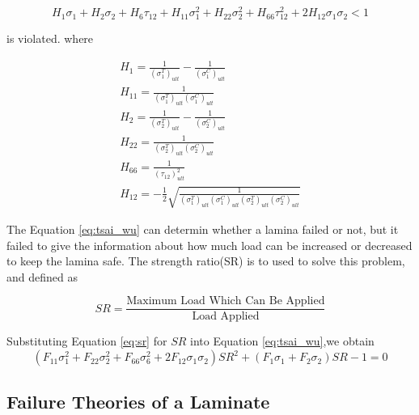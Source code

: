 \documentclass[smallextended]{svjour3}       %
\begin{document}
\begin{equation} \label{eq:tsai_wu}
H_1 \sigma_1 + H_2 \sigma_2 + H_6 \tau_{12} + H_{11}\sigma_1^2 + H_{22} \sigma_2^2 + H_{66}
\tau_{12}^2 + 2H_{12}\sigma_1\sigma_2 < 1
\end{equation}
 
is violated. where


\begin{equation}
	\begin{array}{l}
		H_{1}=\frac{1}{\left(\sigma_{1}^{T}\right)_{u l t}}-\frac{1}{\left(\sigma_{1}^{C}\right)_{u l
	t}} \\
	H_{11}=\frac{1}{\left(\sigma_{1}^{T}\right)_{u l t}\left(\sigma_{1}^{C}\right)_{u l t}} \\
	H_{2}=\frac{1}{\left(\sigma_{2}^{T}\right)_{u l t}}-\frac{1}{\left(\sigma_{2}^{C}\right)_{u l
	t}} \\
	H_{22}=\frac{1}{\left(\sigma_{2}^{T}\right)_{u l t}\left(\sigma_{2}^{C}\right)_{u l t}} \\
	H_{66}=\frac{1}{\left(\tau_{12}\right)_{u l t}^{2}} \\
	H_{12}=-\frac{1}{2} \sqrt{\frac{1}{\left(\sigma_{1}^{T}\right)_{u l
				t}\left(\sigma_{1}^{C}\right)_{u l t}\left(\sigma_{2}^{T}\right)_{u l
	t}\left(\sigma_{2}^{C}\right)_{u l t}}}
	\end{array}
\end{equation}


The Equation \ref{eq:tsai_wu} can determin whether a lamina failed or not, but it failed to give the
information about how much load can be increased or decreased to keep the lamina safe. The strength
ratio(SR) is to used to solve this problem, and defined as

\begin{equation} \label{eq:sr}
	S R=\frac{\text {Maximum Load Which Can Be Applied}}{\text {Load Applied}}
\end{equation}


Substituting Equation \ref{eq:sr} for $SR$ into Equation \ref{eq:tsai_wu},we obtain
\begin{equation}
		(F_{11}\sigma_1^2+F_{22}\sigma_2^2+F_{66}\sigma_6^2+2F_{12}\sigma_1\sigma_2)SR^2 
						 +(F_1\sigma_1+F_2\sigma_2)SR-1=0
\end{equation}




\subsection{Failure Theories of a Laminate}
\end{document}
